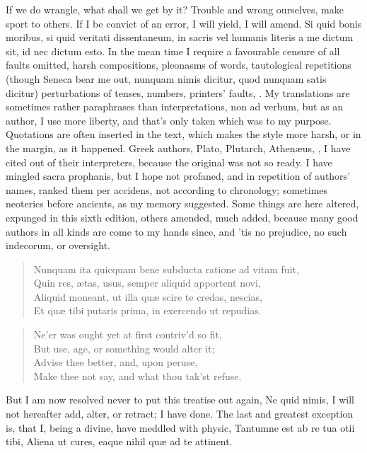 {If we do wrangle, what shall we get by it? Trouble and wrong ourselves,
make sport to others. If I be convict of an error, I will yield, I will
amend. Si quid bonis moribus, si quid veritati dissentaneum, in sacris
vel humanis literis a me dictum sit, id nec dictum esto. In the mean
time I require a favourable censure of all faults omitted, harsh
compositions, pleonasms of words, tautological repetitions (though
Seneca bear me out, nunquam nimis dicitur, quod nunquam satis dicitur)
perturbations of tenses, numbers, printers' faults, \etc. My translations
are sometimes rather paraphrases than interpretations, non ad verbum,
but as an author, I use more liberty, and that's only taken which was
to my purpose. Quotations are often inserted in the text, which makes
the style more harsh, or in the margin, as it happened. Greek authors,
Plato, Plutarch, Athen\ae{}us, \etc, I have cited out of their
interpreters, because the original was not so ready. I have mingled
sacra prophanis, but I hope not profaned, and in repetition of authors'
names, ranked them per accidens, not according to chronology; sometimes
neoterics before ancients, as my memory suggested. Some things are here
altered, expunged in this sixth edition, others amended, much added,
because many good authors in all kinds are come to my hands since,
and 'tis no prejudice, no such indecorum, or oversight.

\settowidth{\versewidth}{Aliquid moneant, ut illa quae scire te credas, nescias,}
\begin{verse}
\textlatin{Nunquam ita quicquam bene subducta ratione ad vitam fuit,\\
Quin res, \ae{}tas, usus, semper aliquid apportent novi,\\
Aliquid moneant, ut illa qu\ae{} scire te credas, nescias,\\
Et qu\ae{} tibi putaris prima, in exercendo ut repudias.}
\end{verse}

\begin{verse}
Ne'er was ought yet at first contriv'd so fit,\\
But use, age, or something would alter it;\\
Advise thee better, and, upon peruse,\\
Make thee not say, and what thou tak'st refuse.\\
\end{verse}

But I am now resolved never to put this treatise out again, Ne quid
nimis, I will not hereafter add, alter, or retract; I have done. The
last and greatest exception is, that I, being a divine, have meddled
with physic,
Tantumne est ab re tua otii tibi,
Aliena ut cures, eaque nihil qu\ae{} ad te attinent.

}
